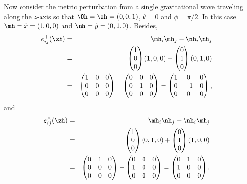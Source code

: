 \documentclass[
reprint,           %
superscriptaddress,%
amsmath,           %
amssymb,           %
aps,               %
prl,               %
notitlepage,       %
floatfix,          %
nofootinbib,
onecolumn
]{revtex4-1}
\def\({\left(}
\def\){\right)}
\def\m{\begin{eqnarray}}
\def\n{\end{eqnarray}}
\begin{document}
Now consider the metric perturbation from a single gravitational wave traveling
along the $z$-axis so that $\Oh=\zh=(0,0,1)$, $\theta=0$ and $\phi=\pi/2$.
In this case $\mh = \hat{x} = (1,0,0)$ and $\nh = \hat{y} = (0,1,0)$.
Besides,
\m 
    e^{+}_{ij}(\zh) &=& \mh_i \mh_j - \nh_i \nh_j\\
        &=& \begin{pmatrix}
            1\\
            0\\
            0
        \end{pmatrix} \(1, 0, 0\) - \begin{pmatrix}
            0\\
            1\\ 
            0
        \end{pmatrix} \(0, 1, 0\)\\
        &=& \begin{pmatrix}
            1 & 0 & 0\\
            0 & 0 & 0\\
            0 & 0 & 0
        \end{pmatrix} - \begin{pmatrix}
        0 & 0 & 0\\
        0 & 1 & 0\\
        0 & 0 & 0
        \end{pmatrix}
        = \begin{pmatrix}
            1 & 0 & 0\\
            0 & -1 & 0\\
            0 & 0 & 0
        \end{pmatrix},
\n
and
\m 
e^{\times}_{ij}(\zh) &=& \mh_i \nh_j + \nh_i \mh_j\\
&=& \begin{pmatrix}
    1\\
    0\\
    0
\end{pmatrix} \(0, 1, 0\) + \begin{pmatrix}
    0\\
    1\\ 
    0
\end{pmatrix} \(1, 0, 0\)\\
&=& \begin{pmatrix}
    0 & 1 & 0\\
    0 & 0 & 0\\
    0 & 0 & 0
\end{pmatrix} + \begin{pmatrix}
    0 & 0 & 0\\
    1 & 0 & 0\\
    0 & 0 & 0
\end{pmatrix}
= \begin{pmatrix}
    0 & 1 & 0\\
    1 & 0 & 0\\
    0 & 0 & 0
\end{pmatrix}.
\n
\end{document}

